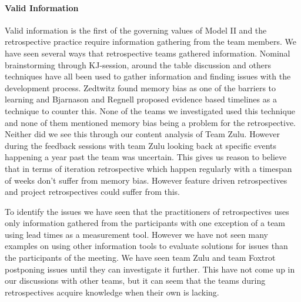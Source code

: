\paragraph{Valid Information}
\label{section:valid-information}
Valid information is the first of the governing values of Model II and the retrospective practice require information gathering from the team members. We have seen several ways that retrospective teams gathered information. Nominal brainstorming through KJ-session, around the table discussion and others techniques have all been used to gather information and finding issues with the development process. Zedtwitz\cite{Zedtwitz2002} found memory bias as one of the barriers to learning and Bjarnason and Regnell\cite{Bjarnason2012} proposed evidence based timelines as a technique to counter this. None of the teams we investigated used this technique and none of them mentioned memory bias being a problem for the retrospective. Neither did we see this through our content analysis of Team Zulu. However during the feedback sessions with team Zulu looking back at specific events happening a year past the team was uncertain. This gives us reason to believe that in terms of iteration retrospective which happen regularly with a timespan of weeks don't suffer from memory bias. However feature driven retrospectives and project retrospectives could suffer from this. 

To identify the issues we have seen that the practitioners of retrospectives uses only information gathered from the participants with one exception of a team using lead times as a measurement tool. However we have not seen many examples on using other information tools to evaluate solutions for issues than the participants of the meeting. We have seen team Zulu and team Foxtrot postponing issues until they can investigate it further. This have not come up in our discussions with other teams, but it can seem that the teams during retrospectives acquire knowledge when their own is lacking.

